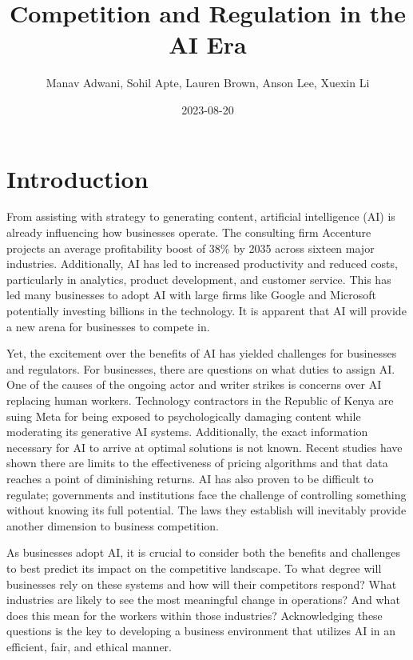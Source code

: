 \documentclass[
]{book}
\title{Competition and Regulation in the AI Era}
\author{Manav Adwani, Sohil Apte, Lauren Brown, Anson Lee, Xuexin Li}
\date{2023-08-20}
\begin{document}
\maketitle

{
\setcounter{tocdepth}{1}
\tableofcontents
}
\hypertarget{introduction}{%
\chapter{Introduction}\label{introduction}}

From assisting with strategy to generating content, artificial intelligence (AI) is already influencing how businesses operate. The consulting firm Accenture projects an average profitability boost of 38\% by 2035 across sixteen major industries. Additionally, AI has led to increased productivity and reduced costs, particularly in analytics, product development, and customer service. This has led many businesses to adopt AI with large firms like Google and Microsoft potentially investing billions in the technology. It is apparent that AI will provide a new arena for businesses to compete in.

Yet, the excitement over the benefits of AI has yielded challenges for businesses and regulators. For businesses, there are questions on what duties to assign AI. One of the causes of the ongoing actor and writer strikes is concerns over AI replacing human workers. Technology contractors in the Republic of Kenya are suing Meta for being exposed to psychologically damaging content while moderating its generative AI systems. Additionally, the exact information necessary for AI to arrive at optimal solutions is not known. Recent studies have shown there are limits to the effectiveness of pricing algorithms and that data reaches a point of diminishing returns. AI has also proven to be difficult to regulate; governments and institutions face the challenge of controlling something without knowing its full potential. The laws they establish will inevitably provide another dimension to business competition.

As businesses adopt AI, it is crucial to consider both the benefits and challenges to best predict its impact on the competitive landscape. To what degree will businesses rely on these systems and how will their competitors respond? What industries are likely to see the most meaningful change in operations? And what does this mean for the workers within those industries? Acknowledging these questions is the key to developing a business environment that utilizes AI in an efficient, fair, and ethical manner.
\end{document}
